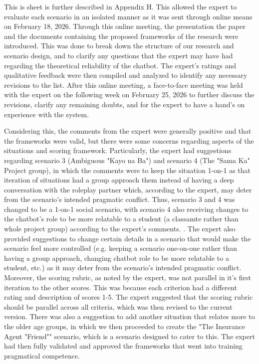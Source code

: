 This is sheet is further described in Appendix H. This allowed the expert to evaluate each scenario in an isolated manner as it was sent through online means on February 18, 2026. Through this online meeting, the presentation the paper and the documents containing the proposed frameworks of the research were introduced. This was done to break down the structure of our research and scenario design, and to clarify any questions that the expert may have had regarding
the theoretical reliability of the chatbot. The expert's ratings and qualitative feedback were then compiled and analyzed to identify any necessary revisions to the list. After this online meeting, a face-to-face meeting was held with the expert on the following week on February 25, 2026 to further discuss the revisions, clarify any remaining doubts, and for the expert to have a hand's on experience with the system. 

Considering this, the comments from the expert were generally positive and that the frameworks were valid, but there were some concerns regarding aspects of the situations and scoring framework. Particularly, the expert had suggestions regarding scenario 3 (Ambiguous "Kayo na Ba")  
and scenario 4 (The "Sama Ka" Project group), in which the comments were to keep the situation 1-on-1 as that iteration of situations had a group approach them instead of having a deep conversation with the roleplay partner which, according to the expert, may deter from the scenario's intended pragmatic conflict. Thus, scenario 3 and 4 was changed to be a 1-on-1 social scenario, with scenario 4 also receiving changes to the chatbot's role to be more relatable to a student (a classamte rather than whole project group) according to the expert's comments.
. The expert also provided suggestions to change certain details in a scenario that would make the scenario feel more controlled (e.g. keeping a scenario one-on-one rather than having a group approach, changing chatbot role to be more relatable to a student, etc.) as it may deter from the scenario's intended pragmatic conflict. Moreover, the scoring rubric, as noted by the expert, was not parallel in it's first iteration to 
the other scores. This was because each criterion had a different rating and description of scores 1-5. The expert suggested that the scoring rubric should be parallel across all criteria, which was then revised to the current version. There was also a suggestion to add another situation that relates more to the older age groups, in which we then proceeded to create the "The Insurance Agent "Friend"" scenario, which is a scenario designed to cater to this.
The expert had then fully validated and approved the frameworks that went into training pragmatical competence.

